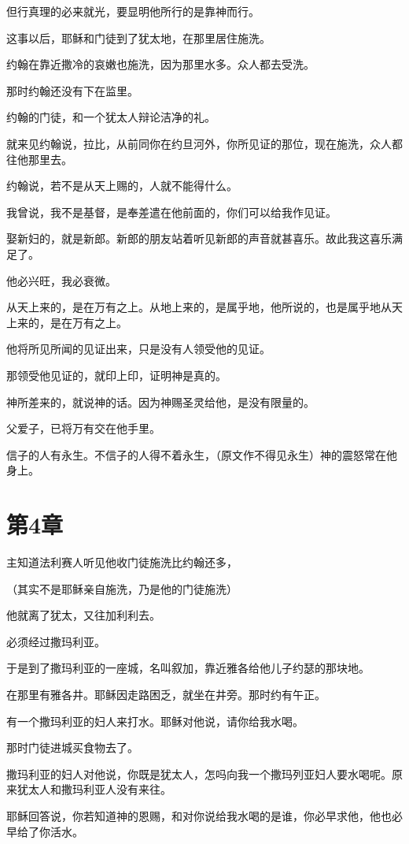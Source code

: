 \documentclass[12pt,oneside]{book}
\begin{document}
但行真理的必来就光，要显明他所行的是靠神而行。

这事以后，耶稣和门徒到了犹太地，在那里居住施洗。

约翰在靠近撒冷的哀嫩也施洗，因为那里水多。众人都去受洗。

那时约翰还没有下在监里。

约翰的门徒，和一个犹太人辩论洁净的礼。

就来见约翰说，拉比，从前同你在约旦河外，你所见证的那位，现在施洗，众人都往他那里去。

约翰说，若不是从天上赐的，人就不能得什么。

我曾说，我不是基督，是奉差遣在他前面的，你们可以给我作见证。

娶新妇的，就是新郎。新郎的朋友站着听见新郎的声音就甚喜乐。故此我这喜乐满足了。

他必兴旺，我必衰微。

从天上来的，是在万有之上。从地上来的，是属乎地，他所说的，也是属乎地从天上来的，是在万有之上。

他将所见所闻的见证出来，只是没有人领受他的见证。

那领受他见证的，就印上印，证明神是真的。

神所差来的，就说神的话。因为神赐圣灵给他，是没有限量的。

父爱子，已将万有交在他手里。

信子的人有永生。不信子的人得不着永生，（原文作不得见永生）神的震怒常在他身上。

\chapter{第4章}
主知道法利赛人听见他收门徒施洗比约翰还多，

（其实不是耶稣亲自施洗，乃是他的门徒施洗）

他就离了犹太，又往加利利去。

必须经过撒玛利亚。

于是到了撒玛利亚的一座城，名叫叙加，靠近雅各给他儿子约瑟的那块地。

在那里有雅各井。耶稣因走路困乏，就坐在井旁。那时约有午正。

有一个撒玛利亚的妇人来打水。耶稣对他说，请你给我水喝。

那时门徒进城买食物去了。

撒玛利亚的妇人对他说，你既是犹太人，怎吗向我一个撒玛列亚妇人要水喝呢。原来犹太人和撒玛利亚人没有来往。

耶稣回答说，你若知道神的恩赐，和对你说给我水喝的是谁，你必早求他，他也必早给了你活水。
\end{document}
